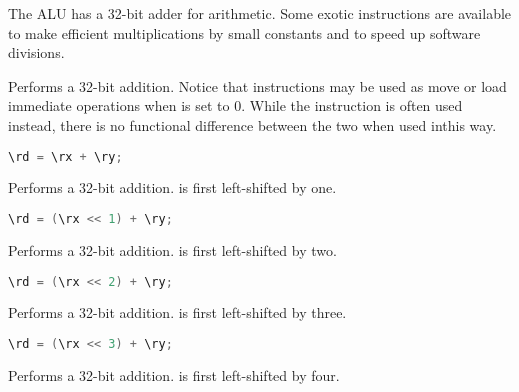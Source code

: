 The \rvex{} ALU has a 32-bit adder for arithmetic. Some exotic instructions are
available to make efficient multiplications by small constants and to speed up
software divisions.

Performs a 32-bit addition. Notice that  instructions may be used as
move or load immediate operations when  is set to 0. While the 
instruction is often used instead, there is no functional difference between the
two when used inthis way.

\begin{lstlisting}[numbers=none, basicstyle=\ttfamily\footnotesize, language=C++]
\rd = \rx + \ry;
\end{lstlisting}

Performs a 32-bit addition. \code{\rx} is first left-shifted by one.

\begin{lstlisting}[numbers=none, basicstyle=\ttfamily\footnotesize, language=C++]
\rd = (\rx << 1) + \ry;
\end{lstlisting}

Performs a 32-bit addition. \code{\rx} is first left-shifted by two.

\begin{lstlisting}[numbers=none, basicstyle=\ttfamily\footnotesize, language=C++]
\rd = (\rx << 2) + \ry;
\end{lstlisting}

Performs a 32-bit addition. \code{\rx} is first left-shifted by three.

\begin{lstlisting}[numbers=none, basicstyle=\ttfamily\footnotesize, language=C++]
\rd = (\rx << 3) + \ry;
\end{lstlisting}

Performs a 32-bit addition. \code{\rx} is first left-shifted by four.


